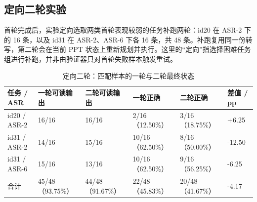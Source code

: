 \documentclass[11pt,a4paper,UTF8,fontset=fandol]{ctexart}
\begin{document}
\subsection{定向二轮实验}

首轮完成后，实验定向选取两类首轮表现较弱的任务补跑两轮：id20 在 ASR-2 下的 16 条，以及 id31 在 ASR-2、ASR-6 下各 16 条，共 48 条。补跑复用同一份转写，第二轮会在当前 PPT 状态上重新规划并执行。这里的“定向”指选择困难任务组进行补跑，并非由验证器只对首轮失败样本触发重试。

\begin{table}[H]
\centering
\caption{定向二轮：匹配样本的一轮与二轮最终状态}
\small
\begin{tabularx}{\textwidth}{Y C{2.1cm} C{2.1cm} C{2.0cm} C{2.0cm} C{1.5cm}}
\toprule
任务 / ASR & 一轮可读输出 & 二轮可读输出 & 一轮正确 & 二轮正确 & 差值 / pp \\
\midrule
id20 / ASR-2 & 16/16 & 16/16 & 2/16（12.50\%） & 3/16（18.75\%） & +6.25 \\
id31 / ASR-2 & 14/16 & 15/16 & 10/16（62.50\%） & 8/16（50.00\%） & -12.50 \\
id31 / ASR-6 & 15/16 & 13/16 & 10/16（62.50\%） & 9/16（56.25\%） & -6.25 \\
\midrule
合计 & 45/48（93.75\%） & 44/48（91.67\%） & 22/48（45.83\%） & 20/48（41.67\%） & -4.17 \\
\bottomrule
\end{tabularx}
\end{table}
\end{document}
